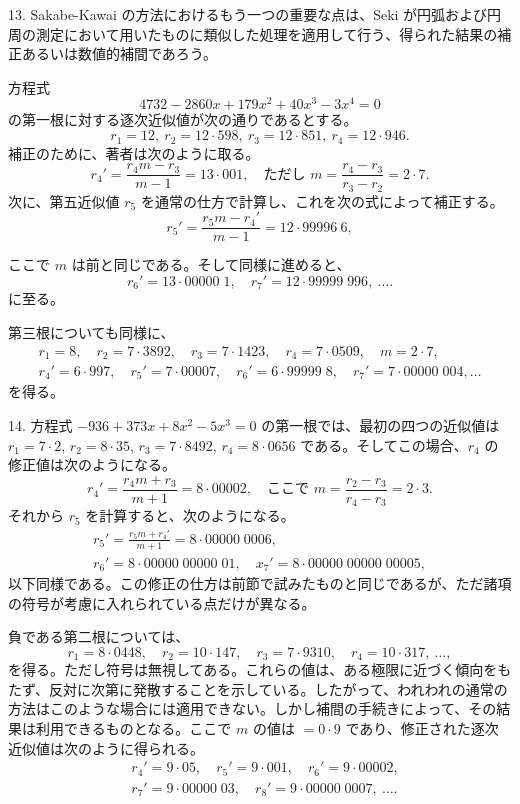 \documentclass[11pt]{article}
\newcommand{\scanpage}[2]{\clearpage\setcounter{footnote}{0}\noindent{\footnotesize\color{gray}PDF #1 頁 · #2}\par\medskip}
\begin{document}
13. Sakabe-Kawai の方法におけるもう一つの重要な点は、Seki が円弧および円周の測定において用いたものに類似した処理を適用して行う、得られた結果の補正あるいは数値的補間であろう。

方程式
\[
4732 - 2860x + 179x^2 + 40x^3 - 3x^4 = 0
\]
の第一根に対する逐次近似値が次の通りであるとする。
\[
r_1 = 12,\ r_2 = 12{\cdot}598,\ r_3 = 12{\cdot}851,\ r_4 = 12{\cdot}946.
\]
補正のために、著者は次のように取る。
\[
r_4' = \frac{r_4 m - r_3}{m - 1} = 13{\cdot}001, \quad \text{ただし } m = \frac{r_4 - r_3}{r_3 - r_2} = 2{\cdot}7.
\]
次に、第五近似値 $r_5$ を通常の仕方で計算し、これを次の式によって補正する。
\[
r_5' = \frac{r_5 m - r_4'}{m - 1} = 12{\cdot}99996\ 6,
\]

\scanpage{0281}{印刷頁 267}
\noindent ここで $m$ は前と同じである。そして同様に進めると、
\[
r_6' = 13{\cdot}00000\;1, \quad r_7' = 12{\cdot}99999\;996, \ \ldots .
\]
に至る。

第三根についても同様に、
\[
\begin{gathered}
r_1 = 8, \quad r_2 = 7{\cdot}3892, \quad r_3 = 7{\cdot}1423, \quad r_4 = 7{\cdot}0509, \quad m = 2{\cdot}7,\\
r_4' = 6{\cdot}997, \quad r_5' = 7{\cdot}00007, \quad r_6' = 6{\cdot}99999\;8, \quad r_7' = 7{\cdot}00000\;004, \ldots
\end{gathered}
\]
を得る。

14. 方程式 $-936 + 373x + 8x^2 - 5x^3 = 0$ の第一根では、最初の四つの近似値は $r_1 = 7{\cdot}2$, $r_2 = 8{\cdot}35$, $r_3 = 7{\cdot}8492$, $r_4 = 8{\cdot}0656$ である。そしてこの場合、$r_4$ の修正値は次のようになる。
\[
r_4' = \frac{r_4 m + r_3}{m + 1} = 8{\cdot}00002, \quad \text{ここで } m = \frac{r_2 - r_3}{r_4 - r_3} = 2{\cdot}3.
\]
それから $r_5$ を計算すると、次のようになる。
\[
\begin{gathered}
r_5' = \frac{r_5 m + r_4'}{m + 1} = 8{\cdot}00000\;0006,\\
r_6' = 8{\cdot}00000\;00000\;01, \quad x_7' = 8{\cdot}00000\;00000\;00005,
\end{gathered}
\]
以下同様である。この修正の仕方は前節で試みたものと同じであるが、ただ諸項の符号が考慮に入れられている点だけが異なる。

負である第二根については、
\[
r_1 = 8{\cdot}0448, \quad r_2 = 10{\cdot}147, \quad r_3 = 7{\cdot}9310, \quad r_4 = 10{\cdot}317, \ \ldots,
\]
を得る。ただし符号は無視してある。これらの値は、ある極限に近づく傾向をもたず、反対に次第に発散することを示している。したがって、われわれの通常の方法はこのような場合には適用できない。しかし補間の手続きによって、その結果は利用できるものとなる。ここで $m$ の値は $= 0{\cdot}9$ であり、修正された逐次近似値は次のように得られる。
\[
\begin{aligned}
&r_4' = 9{\cdot}05, \quad r_5' = 9{\cdot}001, \quad r_6' = 9{\cdot}00002,\\
&r_7' = 9{\cdot}00000\;03, \quad r_8' = 9{\cdot}00000\;0007, \ \ldots .
\end{aligned}
\]
\end{document}
